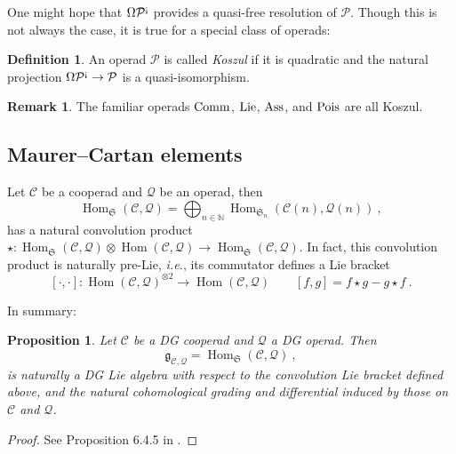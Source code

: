 \documentclass[11pt]{amsart}
\numberwithin{equation}{section}
\newtheorem{prop}[theo]{Proposition}
\theoremstyle{definition}
\newtheorem{defn}[theo]{Definition}
\newtheorem{rmk}[theo]{Remark}
\newcommand{\bb}{\mathbb}
\newcommand{\mc}{\mathcal}
\newcommand{\mf}{\mathfrak}
\DeclareMathOperator{\Hom}{Hom}
\DeclareMathOperator{\Vect}{Vect}
\newcommand{\K}{{\bb K}}
\newcommand{\Alg}{{\textup{Alg}}}
\newcommand{\Pois}{{\textup{Pois}}}
\newcommand{\Comm}{{\textup{Comm}}}
\newcommand{\Lie}{{\textup{Lie}}}
\newcommand{\ash}{{\textup{\mbox{!`}}}}
\newcommand{\Ass}{{\textup{Ass}}}
\newcommand{\Ss}{{{\mf{S}}}}
\newcommand{\CC}{{\textup{CC}}}
\newcommand{\0}{{\textbf{0}}}
\newcommand{\g}{{\mf{g}}}
\def\IN{\mathbb{N}}
\def\CC{{\mc C}}
\def\PP{{\mc P}}
\def\QQ{{\mc Q}}
\def \mf{\mathfrak}
\def \ie{{\it i.e.}}
\begin{document}
One might hope that $\Omega\PP^\ash$ provides a quasi-free resolution of $\PP$. Though this is not always the case, it is true for a special class of operads:
\begin{defn} 
An operad $\mc P$ is called \emph{Koszul} if it is quadratic and the natural projection $\Omega \mc P^\ash \to \mc P$ is a quasi-isomorphism.
\end{defn}

\begin{rmk}
	The familiar operads $\Comm$, $\Lie$, $\Ass$, and $\Pois$ are all Koszul.
\end{rmk}




\subsection{Maurer--Cartan elements}

Let $\CC$ be a cooperad and $\QQ$ be an operad, then
\[
\Hom_\Ss(\CC,\QQ)= \bigoplus_{n\in \IN} \Hom_{\Ss_n}(\CC(n),\QQ(n))~,
\]
has a natural convolution product $\star: \Hom_\Ss(\CC,\QQ)\otimes \Hom(\CC,\QQ) \rightarrow \Hom_\Ss(\CC,\QQ)$. In fact, this convolution product is naturally pre-Lie, \ie, its commutator defines a Lie bracket
\begin{equation}\label{defliebreqn} [ \cdot , \cdot ] : \Hom(\mc C, \mc Q)^{\otimes 2} \to \Hom(\mc C, \mc Q)  \qquad [f,g] = f\star g - g\star f  \ . 
\end{equation}

In summary:


\begin{prop} 
Let $\mc C$ be a DG cooperad and $\mc Q$ a DG operad. Then 
\[
\g_{\mc C,\mc Q}=\Hom_{\Ss}(\mc C, \mc Q) ~,
\]
is naturally a DG Lie algebra with respect to the convolution Lie bracket defined above, and the natural cohomological grading and differential induced by those on $\CC$ and $\QQ$.
\end{prop}
\begin{proof} 
See Proposition 6.4.5 in \cite{LV}.
\end{proof}
\end{document}
